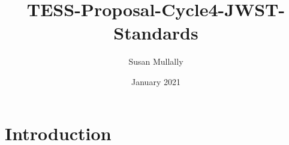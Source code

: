 \documentclass{article}
\title{TESS-Proposal-Cycle4-JWST-Standards}
\author{Susan Mullally}
\date{January 2021}
\begin{document}
\maketitle

\section{Introduction}
\end{document}

